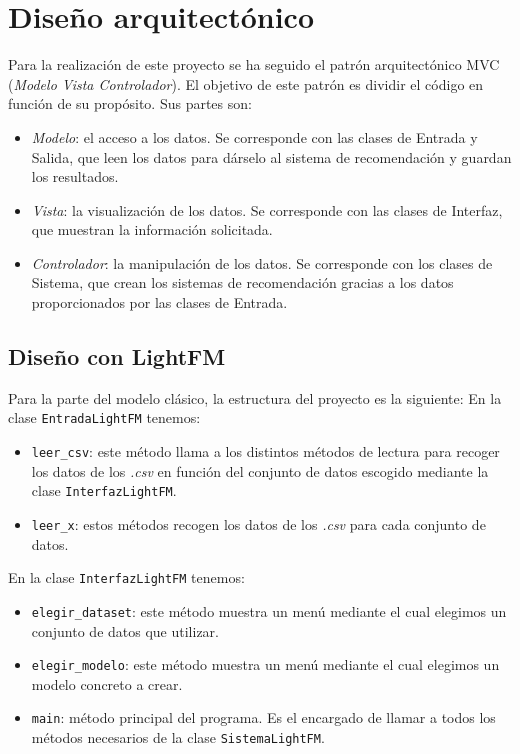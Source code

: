\section{Diseño arquitectónico}
Para la realización de este proyecto se ha seguido el patrón arquitectónico MVC (\textit{Modelo Vista Controlador}). El objetivo de este patrón es dividir el código en función de su propósito. Sus partes son:
\begin{itemize}
\tightlist
\item \textit{Modelo}: el acceso a los datos. Se corresponde con las clases de Entrada y Salida, que leen los datos para dárselo al sistema de recomendación y guardan los resultados.
\item \textit{Vista}: la visualización de los datos. Se corresponde con las clases de Interfaz, que muestran la información solicitada.
\item \textit{Controlador}: la manipulación de los datos. Se corresponde con los clases de Sistema, que crean los sistemas de recomendación gracias a los datos proporcionados por las clases de Entrada.
\end{itemize}


\subsection{Diseño con LightFM}\label{diseño-lightfm}
Para la parte del modelo clásico, la estructura del proyecto es la siguiente:
En la clase \texttt{EntradaLightFM} tenemos:
\begin{itemize}
\tightlist
\item \texttt{leer\_csv}: este método llama a los distintos métodos de lectura para recoger los datos de los \textit{.csv} en función del conjunto de datos escogido mediante la clase \texttt{InterfazLightFM}.
\item \texttt{leer\_x}: estos métodos recogen los datos de los \textit{.csv} para cada conjunto de datos.
\end{itemize}

En la clase \texttt{InterfazLightFM} tenemos:
\begin{itemize}
\tightlist
\item \texttt{elegir\_dataset}: este método muestra un menú mediante el cual elegimos un conjunto de datos que utilizar.
\item \texttt{elegir\_modelo}: este método muestra un menú mediante el cual elegimos un modelo concreto a crear. 
\item \texttt{main}: método principal del programa. Es el encargado de llamar a todos los métodos necesarios de la clase \texttt{SistemaLightFM}. 
\end{itemize}

